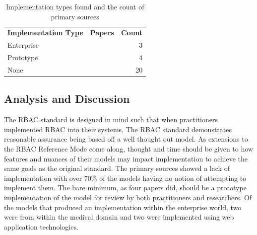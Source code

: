 \begin{table}
\centering
\caption{Implementation types found and the count of primary sources}
\vspace{0.1 in}
\begin{tabular*}{.9\linewidth}{| l | p{.5\linewidth} | r | }
\cline{1-3}

\textbf{Implementation Type} & \textbf{Papers} & \textbf{Count} \\ \cline{1-3}
Enterprise
&
\cite{motta03:contextual}
\cite{aich09:role}
\cite{yao2008task}
&
3 \\ \cline{1-3}
Prototype
& 
\cite{cholewka00:acontext-sensitive}
\cite{huang06:pervasive}
\cite{bao08:role}
\cite{zhou07:network}
&
4 \\ \cline{1-3}
None
&
\cite{alam06:constraint}
\cite{tzelepi01:flexible}
\cite{yamazaki04:designing}
\cite{jian2008extended}
\cite{thein2011leveraging}
\cite{zou2009crbac}
\cite{haibo05:context}
\cite{zhang06:collaborative}
\cite{ni2010privacy}
\cite{masoumzadeh2008purbac}
\cite{damiani2007geo}
\cite{ray2006lrbac}
\cite{hansen2003spatial}
\cite{aich07:STARBAC}
\cite{chen08:spatio-temporal}
\cite{samuel07:spatio-temporal}
\cite{chandran05:llt}
\cite{ray07:spatio}
\cite{oh2003task}
\cite{joshi05:generalized}
&
20 \\

\cline{1-3}
\end{tabular*}
\label{tab:implementations}
\end{table}

\subsection{Analysis and Discussion}

The RBAC standard is designed in mind such that when practitioners implemented RBAC into their systems, The RBAC standard demonstrates reasonable assurance being based off a well thought out model.
As extensions to the RBAC Reference Mode come along, thought and time should be given to how features and nuances of their models may impact implementation to achieve the same goals as the original standard. 
The primary sources showed a lack of implementation
with over 70\% of the models having no notion of attempting to implement them.  The bare minimum, as four papers did, should be
a prototype implementation of the model for review by both practitioners and researchers. Of the models that produced an 
implementation within the enterprise world, two were from within the medical domain and two were implemented using web application technologies.  


